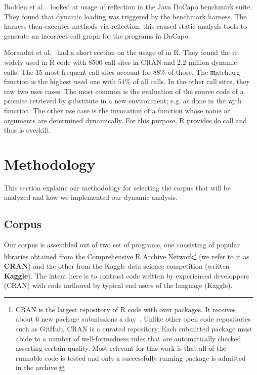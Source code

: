 \documentclass[USenglish,cleveref, autoref, thm-restate]{lipics-v2019}
\begin{document}
Bodden et al.~\cite{bodden} looked at usage of reflection in the Java
DaCapo benchmark suite. They found that dynamic loading was triggered
by the benchmark harness. The harness then executes methods via
reflection, this caused static analysis tools to generate an incorrect
call graph for the programs in DaCapo.

Morandat et al.~\cite{ecoop12} had a short section on the usage of
\eval in R. They found the it widely used in R code with 8500 call
sites in CRAN and 2.2 million dynamic calls. The 15 most frequent call
sites account for 88\% of those. The \c{match.arg} function is the
highest used one with 54\% of all calls. In the other call sites, they
saw two uses cases. The most common is the evaluation of the source
code of a promise retrieved by \c{substitute} in a new environment;
e.g. as done in the \c{with} function. The other use case is the
invocation of a function whose name or arguments are determined
dynamically. For this purpose, R provides \c{do.call} and thus \eval
is overkill.

\section{Methodology}

This section explains our methodology for selecting the corpus that
will be analyzed and how we implemented our dynamic analysis.

\subsection{Corpus}

Our corpus is assembled out of two set of programs, one consisting of
popular libraries obtained from the Comprehensive R Archive
Network\footnote{CRAN is the largest repository of R code with over
\CorpusAllCranRnd packages. It receives about 6 new package
submissions a day~\cite{Ligges2017}. Unlike other open code
repositories such as GitHub, CRAN is a curated repository. Each
submitted package must abide to a number of well-formedness rules that
are automatically checked asserting certain quality. Most relevant for
this work is that all of the runnable code is tested and only a
successfully running package is admitted in the archive.} (we refer to
it as {\bf CRAN}) and the other from the Kaggle data science
competition (written {\bf Kaggle}). The intent here is to contrast
code written by experienced developpers (CRAN) with code authored by
typical end users of the language (Kaggle).
\end{document}
